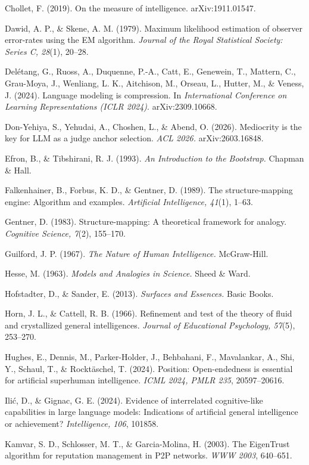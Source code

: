 \documentclass{article}
\begin{document}
Chollet, F. (2019). On the measure of intelligence. arXiv:1911.01547.

Dawid, A. P., \& Skene, A. M. (1979). Maximum likelihood estimation of observer error-rates using the EM algorithm. \emph{Journal of the Royal Statistical Society: Series C, 28}(1), 20--28.

Del\'{e}tang, G., Ruoss, A., Duquenne, P.-A., Catt, E., Genewein, T., Mattern, C., Grau-Moya, J., Wenliang, L. K., Aitchison, M., Orseau, L., Hutter, M., \& Veness, J. (2024). Language modeling is compression. In \emph{International Conference on Learning Representations (ICLR 2024)}. arXiv:2309.10668.

Don-Yehiya, S., Yehudai, A., Choshen, L., \& Abend, O. (2026). Mediocrity is the key for LLM as a judge anchor selection. \emph{ACL 2026.} arXiv:2603.16848.

Efron, B., \& Tibshirani, R. J. (1993). \emph{An Introduction to the Bootstrap.} Chapman \& Hall.

Falkenhainer, B., Forbus, K. D., \& Gentner, D. (1989). The structure-mapping engine: Algorithm and examples. \emph{Artificial Intelligence, 41}(1), 1--63.

Gentner, D. (1983). Structure-mapping: A theoretical framework for analogy. \emph{Cognitive Science, 7}(2), 155--170.

Guilford, J. P. (1967). \emph{The Nature of Human Intelligence.} McGraw-Hill.

Hesse, M. (1963). \emph{Models and Analogies in Science.} Sheed \& Ward.

Hofstadter, D., \& Sander, E. (2013). \emph{Surfaces and Essences.} Basic Books.

Horn, J. L., \& Cattell, R. B. (1966). Refinement and test of the theory of fluid and crystallized general intelligences. \emph{Journal of Educational Psychology, 57}(5), 253--270.

Hughes, E., Dennis, M., Parker-Holder, J., Behbahani, F., Mavalankar, A., Shi, Y., Schaul, T., \& Rockt\"{a}schel, T. (2024). Position: Open-endedness is essential for artificial superhuman intelligence. \emph{ICML 2024, PMLR 235}, 20597--20616.

Ili\'{c}, D., \& Gignac, G. E. (2024). Evidence of interrelated cognitive-like capabilities in large language models: Indications of artificial general intelligence or achievement? \emph{Intelligence, 106}, 101858.

Kamvar, S. D., Schlosser, M. T., \& Garcia-Molina, H. (2003). The EigenTrust algorithm for reputation management in P2P networks. \emph{WWW 2003}, 640--651.
\end{document}
